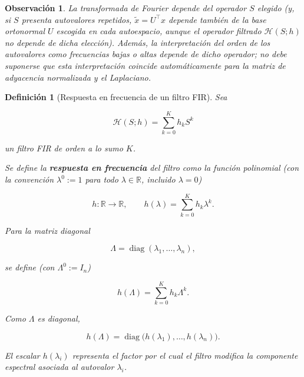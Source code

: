 \documentclass[a4paper,openany,oneside,10pt]{report}
\theoremstyle{pnlTeorema}
\theoremstyle{pnlDefinicion}
\newtheorem{definicion}{Definición}[section]
\theoremstyle{pnlObservacion}
\newtheorem{observacion}{Observación}[section]
\begin{document}
\begin{observacion}
La transformada de Fourier depende del operador \(S\) elegido (y, si \(S\) presenta autovalores repetidos, \(\widetilde x=U^\top x\) depende también de la base ortonormal \(U\) escogida en cada autoespacio, aunque el operador filtrado \(\mathcal H(S;h)\) no depende de dicha elección). Además, la interpretación del orden de los autovalores como frecuencias bajas o altas depende de dicho operador; no debe suponerse que esta interpretación coincide automáticamente para la matriz de adyacencia normalizada y el Laplaciano.
\end{observacion}


\begin{definicion}[Respuesta en frecuencia de un filtro FIR]\label{def:respuesta-frecuencia}
Sea

\[
\mathcal H(S;h)=\sum_{k=0}^{K}h_kS^k
\]

un filtro FIR de orden a lo sumo \(K\).

Se define la \textbf{respuesta en frecuencia} del filtro como la función polinomial (con la convención \(\lambda^0:=1\) para todo \(\lambda\in\mathbb R\), incluido \(\lambda=0\))

\[
h:\mathbb R\longrightarrow\mathbb R,
\qquad
h(\lambda)=\sum_{k=0}^{K}h_k\lambda^k.
\]

Para la matriz diagonal

\[
\Lambda=\operatorname{diag}(\lambda_1,\ldots,\lambda_n),
\]

se define (con \(\Lambda^0:=I_n\))

\[
h(\Lambda)=\sum_{k=0}^{K}h_k\Lambda^k.
\]

Como \(\Lambda\) es diagonal,

\[
h(\Lambda)=
\operatorname{diag}\bigl(
h(\lambda_1),\ldots,h(\lambda_n)
\bigr).
\]

El escalar \(h(\lambda_i)\) representa el factor por el cual el filtro modifica la componente espectral asociada al autovalor \(\lambda_i\).
\end{definicion}
\end{document}
